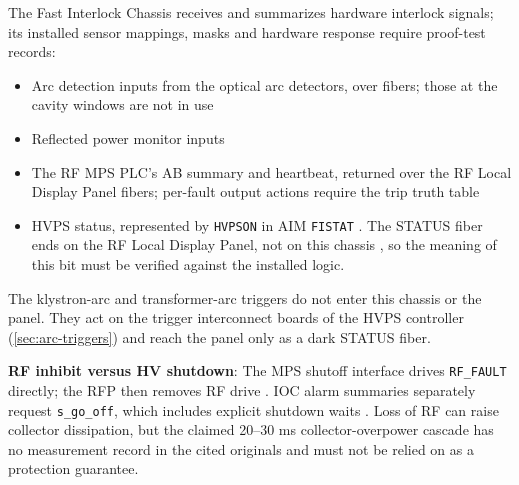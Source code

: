 
\noindent The Fast Interlock Chassis receives and summarizes hardware interlock signals; its installed sensor mappings, masks and hardware response require proof-test records:

\begin{itemize}
\tightlist
\item
  Arc detection inputs from the optical arc detectors, over fibers; those at the cavity windows are not in use 
\item
  Reflected power monitor inputs
\item
  The RF MPS PLC's AB summary and heartbeat, returned over the RF Local Display Panel fibers; per-fault output actions require the trip truth table
\item
  HVPS status, represented by \texttt{HVPSON} in AIM \texttt{FISTAT} . The STATUS fiber ends on the RF Local Display Panel, not on this chassis , so the meaning of this bit must be verified against the installed logic.
\end{itemize}

The klystron-arc and transformer-arc triggers do not enter this chassis or the panel. They act on the trigger interconnect boards of the HVPS controller (\cref{sec:arc-triggers}) and reach the panel only as a dark STATUS fiber.

\begin{keynote}
\textbf{RF inhibit versus HV shutdown}: The MPS shutoff interface drives \texttt{RF\_FAULT} directly; the RFP then removes RF drive . IOC alarm summaries separately request \texttt{s\_go\_off}, which includes explicit shutdown waits . Loss of RF can raise collector dissipation, but the claimed 20--30 ms collector-overpower cascade has no measurement record in the cited originals and must not be relied on as a protection guarantee.
\end{keynote}

